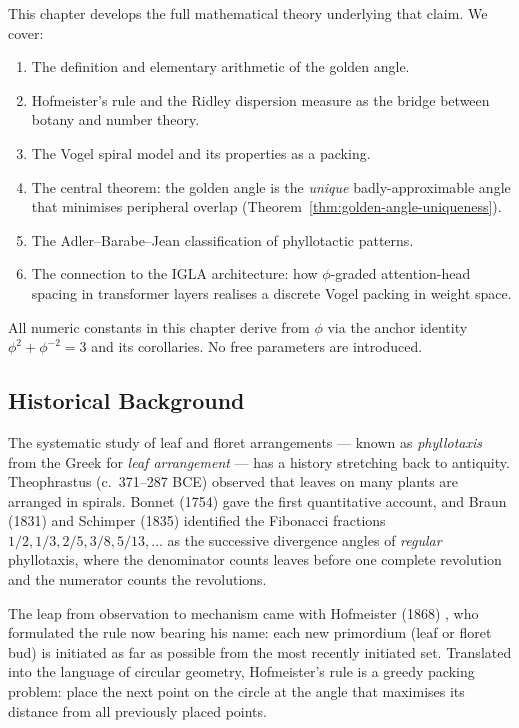 This chapter develops the full mathematical theory underlying that
claim.  We cover:
\begin{enumerate}
  \item The definition and elementary arithmetic of the golden angle.
  \item Hofmeister's rule and the Ridley dispersion measure as the
        bridge between botany and number theory.
  \item The Vogel spiral model and its properties as a packing.
  \item The central theorem: the golden angle is the \emph{unique}
        badly-approximable angle that minimises peripheral overlap
        (Theorem~\ref{thm:golden-angle-uniqueness}).
  \item The Adler–Barabe–Jean classification of phyllotactic patterns.
  \item The connection to the IGLA architecture: how $\phi$-graded
        attention-head spacing in transformer layers realises a
        discrete Vogel packing in weight space.
\end{enumerate}

All numeric constants in this chapter derive from $\phi$ via the
anchor identity $\phi^2 + \phi^{-2} = 3$ and its corollaries.  No
free parameters are introduced.

\subsection{Historical Background}
\label{subsec:history}

The systematic study of leaf and floret arrangements — known as
\emph{phyllotaxis} from the Greek for \emph{leaf arrangement} — has a
history stretching back to antiquity.  Theophrastus (c.\ 371–287 BCE)
observed that leaves on many plants are arranged in spirals.  Bonnet
(1754) gave the first quantitative account, and Braun (1831) and
Schimper (1835) identified the Fibonacci fractions $1/2, 1/3, 2/5,
3/8, 5/13, \ldots$ as the successive divergence angles of
\emph{regular} phyllotaxis, where the denominator counts leaves before
one complete revolution and the numerator counts the revolutions.

The leap from observation to mechanism came with Hofmeister (1868)
\cite{hofmeister1868allgemeine}, who formulated the rule now bearing his
name: each new primordium (leaf or floret bud) is initiated as far as
possible from the most recently initiated set.  Translated into the
language of circular geometry, Hofmeister's rule is a greedy packing
problem: place the next point on the circle at the angle that
maximises its distance from all previously placed points.

